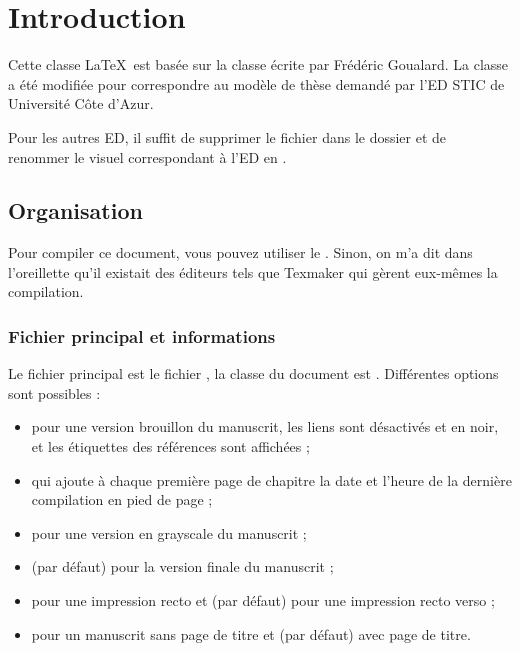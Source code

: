 
\chapter{Introduction}

Cette classe \LaTeX\ est basée sur la classe  écrite par Frédéric Goualard. La classe a été modifiée pour correspondre au modèle de thèse demandé par l'ED STIC de Université Côte d'Azur.

Pour les autres ED, il suffit de supprimer le fichier  dans le dossier  et de renommer le visuel correspondant à l'ED en .

\section{Organisation}\label{sec:orga}

Pour compiler ce document, vous pouvez utiliser le . Sinon, on m'a dit dans l'oreillette qu'il existait des éditeurs tels que Texmaker qui gèrent eux-mêmes la compilation.

\subsection{Fichier principal et informations}
Le fichier principal est le fichier , la classe du document est .
Différentes options sont possibles :
\begin{itemize}
  \item {} pour une version brouillon du manuscrit, les liens sont désactivés et en noir, et les étiquettes des références sont affichées ;
  \item {} qui ajoute à chaque première page de chapitre la date et l'heure de la dernière compilation en pied de page ;
  \item {} pour une version en grayscale du manuscrit ;
  \item {} (par défaut) pour la version finale du manuscrit ;
  \item {} pour une impression recto et  (par défaut) pour une impression recto verso ;
  \item {} pour un manuscrit sans page de titre et  (par défaut) avec page de titre.
\end{itemize}

